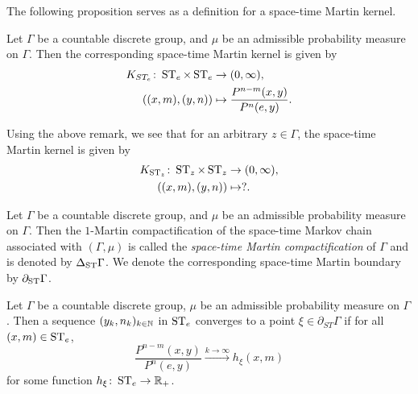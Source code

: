 \documentclass[12pt, class = article, crop = false, a4paper, twoside]{standalone}
\begin{document}
The following proposition serves as a definition for a space-time Martin kernel. 
\begin{proposition}[REF]

    Let $\Gamma$ be a countable discrete group, and $\mu$ be an admissible probability measure on $\Gamma$. Then the corresponding space-time Martin kernel is given by
    \begin{equation*}
        \begin{split}
            K_{ST_{e}}\colon\operatorname{ST}_{e}\times\operatorname{ST}_{e} & \to (0, \infty), \\
            ((x, m), (y, n)) & \mapsto \frac{P^{n - m}(x, y)}{P^{n}(e, y)}.
        \end{split}
    \end{equation*}
\end{proposition}

\begin{remark}

    Using the above remark, we see that for an arbitrary $z\in\Gamma$, the space-time Martin kernel is given by
    \begin{equation*}
        \begin{split}
            K_{\operatorname{ST}_{z}}\colon\operatorname{ST}_{z}\times\operatorname{ST}_{z} & \to (0, \infty), \\
            ((x, m), (y, n)) & \mapsto ?.
        \end{split}
    \end{equation*}
\end{remark}

\begin{definition}

    Let $\Gamma$ be a countable discrete group, and $\mu$ be an admissible probability measure on $\Gamma$. Then the $1$-Martin compactification of the space-time Markov chain associated with $(\Gamma, \mu)$ is called the \textit{space-time Martin compactification} of $\Gamma$ and is denoted by $\Delta_{\operatorname{ST}}\Gamma$. We denote the corresponding space-time Martin boundary by $\partial_{\operatorname{ST}}\Gamma$.
\end{definition}

\begin{proposition}[REF]

    Let $\Gamma$ be a countable discrete group, $\mu$ be an admissible probability measure on $\Gamma$. Then a sequence $(y_{k}, n_{k})_{k\in\mathbb{N}}$ in $\operatorname{ST}_{e}$ converges to a point $\xi\in\partial_{ST}\Gamma$ if for all $(x, m)\in\operatorname{ST}_{e}$,
    \begin{equation*}
        \frac{P^{n - m}(x, y)}{P^{n}(e, y)}\xrightarrow{k\to\infty}h_{\xi}(x, m)
    \end{equation*}
    for some function $h_{\xi}\colon\operatorname{ST}_{e}\to\mathbb{R}_{+}$.
\end{proposition}
\end{document}
